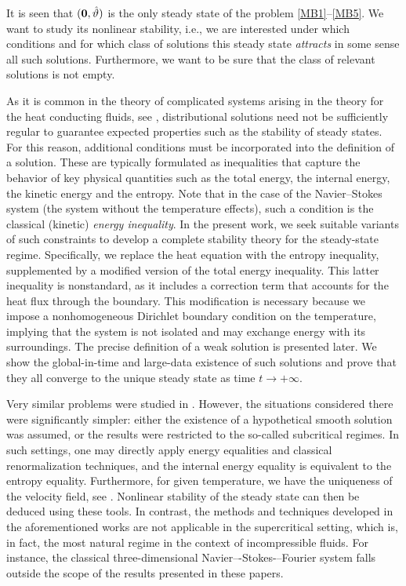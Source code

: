 \documentclass[11pt, a4paper, reqno]{amsart}
\numberwithin{equation}{section}
\newcommand{\thetah}{\hat\thet}
\newcommand{\vc}[1]{{\bf #1}}
\newcommand{\thet}{\vartheta}
\begin{document}
It is seen that $(\vc{0}, \thetah)$ %
is the only steady state of the problem \eqref{MB1}--\eqref{MB5}. We want to study its nonlinear stability, i.e., we are interested under which conditions and for which class of solutions this steady state \emph{attracts} in some sense all such solutions. Furthermore, we want to be sure that the class of relevant solutions is not empty.

As it is common in the theory of complicated systems arising in the theory for the heat conducting fluids, see \cite{A21, ABK22, AbBuKa2024, FeNo2021, FeiMa2006, FeNo2017}, distributional solutions need not be sufficiently regular to guarantee expected properties such as the stability of steady states. For this reason, additional conditions must be incorporated into the definition of a solution. These are typically formulated as inequalities that capture the behavior of key physical quantities such as the total energy, the internal energy, the kinetic energy and the entropy. Note that in the case of the Navier--Stokes system (the system without the temperature effects), such a condition is the classical (kinetic) \emph{energy inequality}. In the present work, we seek suitable variants of such constraints to develop a complete stability theory for the steady-state regime. Specifically, we replace the heat equation with the entropy inequality, supplemented by a modified version of the total energy inequality. This latter inequality is nonstandard, as it includes a correction term that accounts for the heat flux through the boundary. This modification is necessary because we impose a nonhomogeneous Dirichlet boundary condition on the temperature, implying that the system is not isolated and may exchange energy with its surroundings.
The precise definition of a weak solution is presented later. We show the global-in-time and large-data existence of such solutions and prove that they all converge to the unique steady state as time $t\to +\infty$.

Very similar problems were studied in \cite{BuMaPr19, DosPruRaj, ABK22, AbBuKa2024}. However, the situations considered there were significantly simpler: either the existence of a hypothetical smooth solution was assumed, or the results were restricted to the so-called subcritical regimes. In such settings, one may directly apply energy equalities and classical renormalization techniques, and the internal energy equality is equivalent to the entropy equality. Furthermore, for given temperature, we have the uniqueness of the velocity field, see \cite{BuKaPr19}. Nonlinear stability of the steady state can then be deduced using these tools. In contrast, the methods and techniques developed in the aforementioned works are not applicable in the supercritical setting, which is, in fact, the most natural regime in the context of incompressible fluids. For instance, the classical three-dimensional Navier–-Stokes-–Fourier system falls outside the scope of the results presented in these papers.
\end{document}
